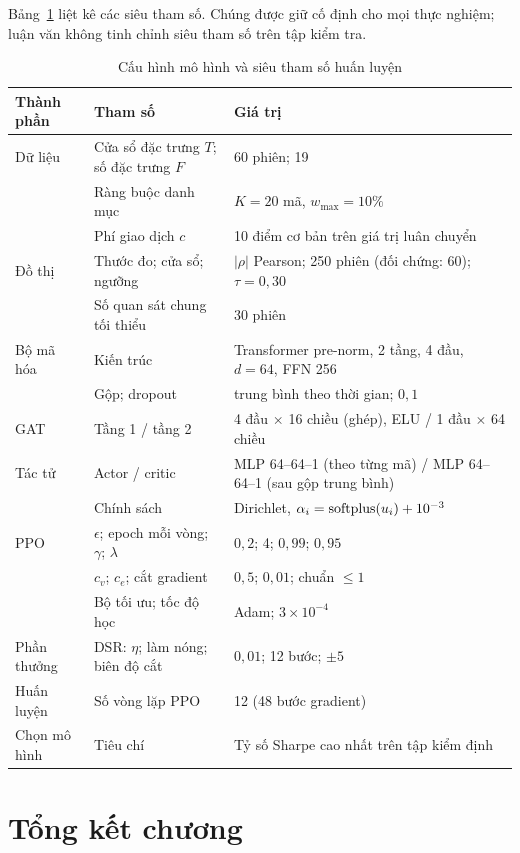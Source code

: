Bảng~\ref{tab:hyper} liệt kê các siêu tham số. Chúng được giữ cố định cho mọi thực nghiệm; luận văn không tinh chỉnh siêu tham số trên tập kiểm tra.

\begin{table}[ht]
\centering\small
\caption{Cấu hình mô hình và siêu tham số huấn luyện}
\label{tab:hyper}
\begin{tabular}{@{}llp{6.4cm}@{}}
\toprule
Thành phần & Tham số & Giá trị \\
\midrule
Dữ liệu & Cửa sổ đặc trưng $T$; số đặc trưng $F$ & 60 phiên; 19 \\
 & Ràng buộc danh mục & $K=20$ mã, $w_{\max}=10\%$ \\
 & Phí giao dịch $c$ & 10 điểm cơ bản trên giá trị luân chuyển \\
Đồ thị & Thước đo; cửa sổ; ngưỡng & $|\rho|$ Pearson; 250 phiên (đối chứng: 60); $\tau=0{,}30$ \\
 & Số quan sát chung tối thiểu & 30 phiên \\
Bộ mã hóa & Kiến trúc & Transformer pre-norm, 2 tầng, 4 đầu, $d=64$, FFN 256 \\
 & Gộp; dropout & trung bình theo thời gian; $0{,}1$ \\
GAT & Tầng 1 / tầng 2 & 4 đầu $\times$ 16 chiều (ghép), ELU / 1 đầu $\times$ 64 chiều \\
Tác tử & Actor / critic & MLP 64--64--1 (theo từng mã) / MLP 64--64--1 (sau gộp trung bình) \\
 & Chính sách & Dirichlet, $\alpha_i=\operatorname{softplus}(u_i)+10^{-3}$ \\
PPO & $\epsilon$; epoch mỗi vòng; $\gamma$; $\lambda$ & $0{,}2$; 4; $0{,}99$; $0{,}95$ \\
 & $c_v$; $c_e$; cắt gradient & $0{,}5$; $0{,}01$; chuẩn $\le 1$ \\
 & Bộ tối ưu; tốc độ học & Adam; $3\times10^{-4}$ \\
Phần thưởng & DSR: $\eta$; làm nóng; biên độ cắt & $0{,}01$; 12 bước; $\pm5$ \\
Huấn luyện & Số vòng lặp PPO & 12 (48 bước gradient) \\
Chọn mô hình & Tiêu chí & Tỷ số Sharpe cao nhất trên tập kiểm định \\
\bottomrule
\end{tabular}
\end{table}

\section{Tổng kết chương}

